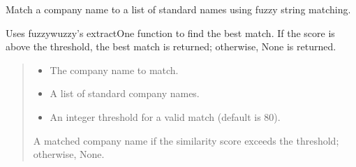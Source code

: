 \documentclass[letterpaper,10pt,english]{sphinxmanual}
\begin{document}
\begin{fulllineitems}
\label{\detokenize{autoapi/modules/output/data_clean/index:modules.output.data_clean.match_company}}
\pysigstartsignatures
\pysiglinewithargsret
{}
{\sphinxparamcomma {}\sphinxparamcomma {}}
{}
\pysigstopsignatures
\sphinxAtStartPar
Match a company name to a list of standard names using fuzzy string matching.

\sphinxAtStartPar
Uses fuzzywuzzy’s extractOne function to find the best match. If the score is above the threshold,
the best match is returned; otherwise, None is returned.
\begin{quote}\begin{description}
\begin{itemize}
\item {} 
\sphinxAtStartPar
{} \textendash{} The company name to match.

\item {} 
\sphinxAtStartPar
{} \textendash{} A list of standard company names.

\item {} 
\sphinxAtStartPar
{} \textendash{} An integer threshold for a valid match (default is 80).

\end{itemize}

\sphinxAtStartPar
A matched company name if the similarity score exceeds the threshold; otherwise, None.

\end{description}\end{quote}

\end{fulllineitems}


\begin{fulllineitems}
\label{\detokenize{autoapi/modules/output/data_clean/index:id4}}
\pysigstartsignatures
\pysigline
{}
\pysigstopsignatures
\end{fulllineitems}
\end{document}
